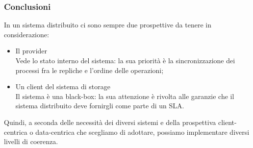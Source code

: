 \begin{frame}
\frametitle{Conclusioni}
In un sistema distribuito ci sono sempre due prospettive da tenere in considerazione:
\begin{itemize}
	\item Il provider \\
		  Vede lo stato interno del sistema: la sua priorità è la sincronizzazione
		  dei processi fra le repliche e l'ordine delle operazioni;
	\item Un client del sistema di storage \\
		  Il sistema è una black-box: la sua attenzione è rivolta alle garanzie che
		  il sistema distribuito deve fornirgli come parte di un SLA.
\end{itemize}
Quindi, a seconda delle necessità dei diversi sistemi e della prospettiva client-centrica
o data-centrica che scegliamo di adottare, possiamo implementare diversi livelli di coerenza.
\end{frame}